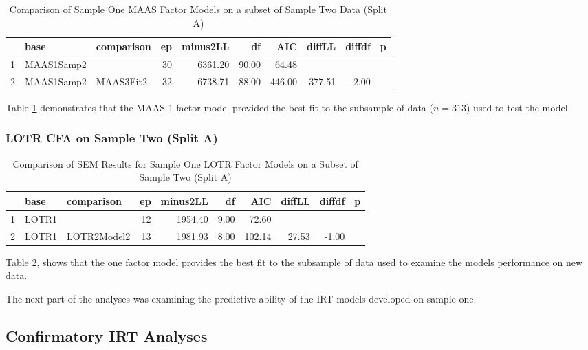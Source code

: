 \documentclass{article}
\begin{document}
\begin{table}[ht]
\centering
\begin{tabular}{rllrrrrrrr}
  \hline
 & base & comparison & ep & minus2LL & df & AIC & diffLL & diffdf & p \\ 
  \hline
1 & MAAS1Samp2 &  &  30 & 6361.20 & 90.00 & 64.48 &  &  &  \\ 
  2 & MAAS1Samp2 & MAAS3Fit2 &  32 & 6738.71 & 88.00 & 446.00 & 377.51 & -2.00 &  \\ 
   \hline
\end{tabular}
\caption{Comparison of Sample One MAAS Factor Models on a subset of Sample Two Data (Split A)} 
\label{tab:maassemcompare2}
\end{table}
Table \ref{tab:maassemcompare2} demonstrates that the MAAS 1 factor model provided the best fit to the subsample of data ($n=313$) used to test the model.

\subsubsection{LOTR CFA on Sample Two (Split A)}
\label{sec:lotr-cfa-sample}






\begin{table}[ht]
\centering
\begin{tabular}{rllrrrrrrr}
  \hline
 & base & comparison & ep & minus2LL & df & AIC & diffLL & diffdf & p \\ 
  \hline
1 & LOTR1 &  &  12 & 1954.40 & 9.00 & 72.60 &  &  &  \\ 
  2 & LOTR1 & LOTR2Model2 &  13 & 1981.93 & 8.00 & 102.14 & 27.53 & -1.00 &  \\ 
   \hline
\end{tabular}
\caption{Comparison of SEM Results for Sample One LOTR Factor Models on a Subset of Sample Two (Split A)} 
\label{tab:lotrcompare2}
\end{table}
Table \ref{tab:lotrcompare2}, shows that the one factor model provides the best fit to the subsample of data used to examine the models performance on new data.

The next part of the analyses was examining the predictive ability of the IRT models developed on sample one.

\subsection{Confirmatory IRT Analyses}
\label{sec:conf-irt-analys}
\end{document}
